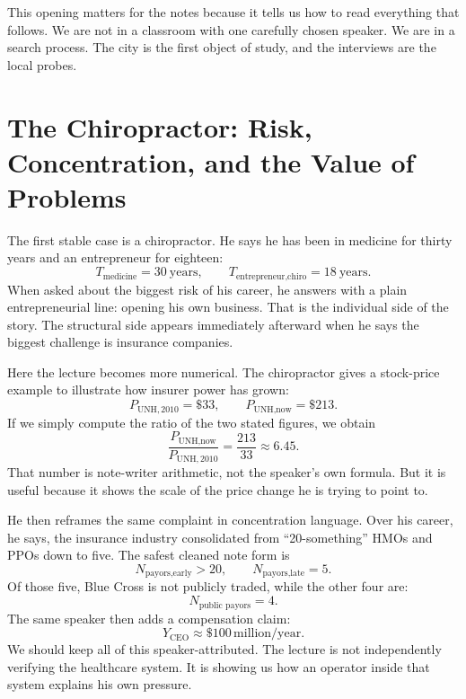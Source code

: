 This opening matters for the notes because it tells us how to read everything that follows. We are not in a classroom with one carefully chosen speaker. We are in a search process. The city is the first object of study, and the interviews are the local probes.

\section{The Chiropractor: Risk, Concentration, and the Value of Problems}

The first stable case is a chiropractor. He says he has been in medicine for thirty years and an entrepreneur for eighteen:
\begin{equation}
T_{\text{medicine}} = 30\ \text{years},\qquad
T_{\text{entrepreneur,chiro}} = 18\ \text{years}.
\end{equation}
When asked about the biggest risk of his career, he answers with a plain entrepreneurial line: opening his own business. That is the individual side of the story. The structural side appears immediately afterward when he says the biggest challenge is insurance companies.

Here the lecture becomes more numerical. The chiropractor gives a stock-price example to illustrate how insurer power has grown:
\begin{equation}
P_{\text{UNH},2010} = \$33,\qquad
P_{\text{UNH},\text{now}} = \$213.
\end{equation}
If we simply compute the ratio of the two stated figures, we obtain
\begin{equation}
\frac{P_{\text{UNH},\text{now}}}{P_{\text{UNH},2010}}
= \frac{213}{33}\approx 6.45.
\end{equation}
That number is note-writer arithmetic, not the speaker's own formula. But it is useful because it shows the scale of the price change he is trying to point to.

He then reframes the same complaint in concentration language. Over his career, he says, the insurance industry consolidated from ``20-something'' HMOs and PPOs down to five. The safest cleaned note form is
\begin{equation}
N_{\text{payors,early}} > 20,\qquad
N_{\text{payors,late}} = 5.
\end{equation}
Of those five, Blue Cross is not publicly traded, while the other four are:
\begin{equation}
N_{\text{public payors}} = 4.
\end{equation}
The same speaker then adds a compensation claim:
\begin{equation}
Y_{\text{CEO}} \approx \$100\,\text{million/year}.
\end{equation}
We should keep all of this speaker-attributed. The lecture is not independently verifying the healthcare system. It is showing us how an operator inside that system explains his own pressure.


